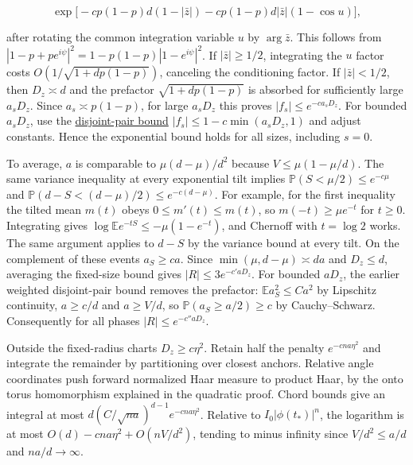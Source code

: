 \begin{equation*}
\exp\!\big[-c p(1-p)d(1-|\bar z|)-c p(1-p)d|\bar z|(1-\cos u)\big],
\end{equation*}

after rotating the common integration variable $u$ by $\arg\bar z$. This follows from $|1-p+pe^{i\psi}|^2=1-p(1-p)|1-e^{i\psi}|^2$. If $|\bar z|\ge1/2$, integrating the $u$ factor costs $O(1/\sqrt{1+d p(1-p)})$, canceling the conditioning factor. If $|\bar z|<1/2$, then $D_z\asymp d$ and the prefactor $\sqrt{1+d p(1-p)}$ is absorbed for sufficiently large $a_sD_z$. Since $a_s\asymp p(1-p)$, for large $a_sD_z$ this proves $|f_s|\le e^{-c a_sD_z}$. For bounded $a_sD_z$, use the \href{https://github.com/ProgramComputer/open-math-research/blob/04564a728c21eab6ce511b98a48ccaac754648ff/topics/balanced-arrays/very-tall/very-tall-interior-saddle.md}{disjoint-pair bound} $|f_s|\le1-c\min(a_sD_z,1)$ and adjust constants. Hence the exponential bound holds for all sizes, including $s=0$.

To average, $a$ is comparable to $\mu(d-\mu)/d^2$ because $V\le\mu(1-\mu/d)$. The same variance inequality at every exponential tilt implies
$\mathbb P(S<\mu/2)\le e^{-c\mu}$ and $\mathbb P(d-S<(d-\mu)/2)\le e^{-c(d-\mu)}$. For example, for the first inequality the tilted mean $m(t)$ obeys $0\le m'(t)\le m(t)$, so $m(-t)\ge\mu e^{-t}$ for $t\ge0$. Integrating gives $\log\mathbb E e^{-tS}\le-\mu(1-e^{-t})$, and Chernoff with $t=\log2$ works. The same argument applies to $d-S$ by the variance bound at every tilt. On the complement of these events $a_S\ge c a$. Since $\min(\mu,d-\mu)\asymp da$ and $D_z\le d$, averaging the fixed-size bound gives $|R|\le3e^{-c'aD_z}$. For bounded $aD_z$, the earlier weighted disjoint-pair bound removes the prefactor: $\mathbb E a_S^2\le C a^2$ by Lipschitz continuity, $a\ge c/d$ and $a\ge V/d$, so $\mathbb P(a_S\ge a/2)\ge c$ by Cauchy--Schwarz. Consequently for all phases $|R|\le e^{-c'' aD_z}$.

Outside the fixed-radius charts $D_z\ge c\eta^2$. Retain half the penalty $e^{-cna\eta^2}$ and integrate the remainder by partitioning over closest anchors. Relative angle coordinates push forward normalized Haar measure to product Haar, by the onto torus homomorphism explained in the quadratic proof. Chord bounds give an integral at most $d(C/\sqrt{na})^{d-1}e^{-cna\eta^2}$. Relative to $I_0|\phi(t_*)|^n$, the logarithm is at most $O(d)-cna\eta^2+O(nV/d^2)$, tending to minus infinity since $V/d^2\le a/d$ and $na/d\to\infty$.

